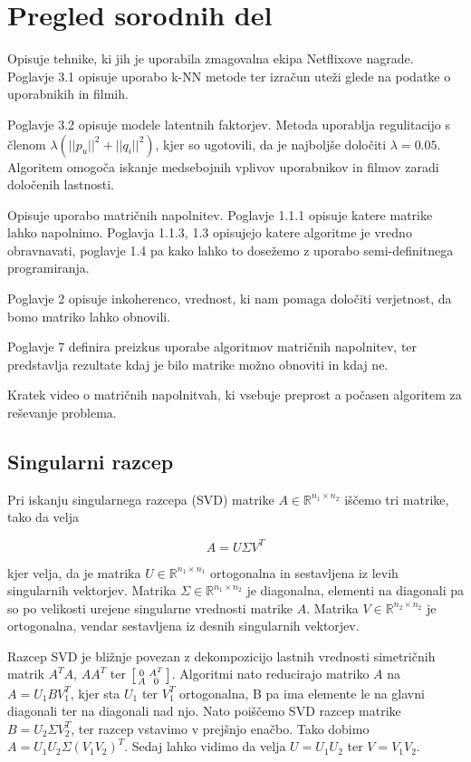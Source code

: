 \chapter{Pregled sorodnih del}


\cite{BK07} Opisuje tehnike, ki jih je uporabila zmagovalna ekipa Netflixove nagrade.
Poglavje 3.1 opisuje uporabo k-NN metode ter izračun uteži glede na podatke o uporabnikih in filmih.

Poglavje 3.2 opisuje modele latentnih faktorjev. Metoda uporablja regulitacijo 
s členom $\lambda (||p_u||^2 + ||q_i||^2)$, kjer so ugotovili,
da je najboljše določiti $\lambda=0.05$. Algoritem omogoča iskanje medsebojnih vplivov
uporabnikov in filmov zaradi določenih lastnosti.

\cite{CR08} Opisuje uporabo matričnih napolnitev.
Poglavje 1.1.1 opisuje katere matrike lahko napolnimo.
Poglavja 1.1.3, 1.3 opisujejo katere algoritme je vredno obravnavati, poglavje 1.4 pa kako lahko to dosežemo z uporabo semi-definitnega programiranja.

Poglavje 2 opisuje inkoherenco, vrednost, ki nam pomaga določiti verjetnost,
da bomo matriko lahko obnovili.

Poglavje 7 definira preizkus uporabe algoritmov matričnih napolnitev,
ter predstavlja rezultate kdaj je bilo matrike možno obnoviti in kdaj ne.

\cite{VV20} Kratek video o matričnih napolnitvah, ki vsebuje preprost a počasen algoritem 
za reševanje problema.

\section{Singularni razcep}

Pri iskanju singularnega razcepa (SVD) matrike $A \in \mathbb{R}^{n_1 \times n_2}$ iščemo tri matrike, tako da velja

\[
A = U \Sigma V^T
\]

kjer velja, da je matrika $U \in \mathbb{R}^{n_1 \times n_1}$ ortogonalna in sestavljena iz levih singularnih vektorjev. Matrika $\Sigma \in \mathbb{R}^{n_1 \times n_2}$ je diagonalna, elementi na diagonali pa so po velikosti urejene singularne vrednosti matrike $A$. Matrika $V \in \mathbb{R}^{n_2 \times n_2}$ je ortogonalna, vendar sestavljena iz desnih singularnih vektorjev. 

Razcep SVD je bližnje povezan z dekompozicijo lastnih vrednosti simetričnih matrik $A^T A$, $A A^T$ ter 
$\begin{bsmallmatrix}
  0 & A^T\\
  A & 0
\end{bsmallmatrix}$.
Algoritmi nato reducirajo matriko $A$  na $A = U_1BV_1^T$, kjer sta $U_1$ ter $V_1^T$ ortogonalna, B pa ima elemente le na glavni diagonali ter na diagonali nad njo. Nato poiščemo SVD razcep matrike $B = U_2 \Sigma V_2^T$, ter razcep vstavimo v prejšnjo enačbo. Tako dobimo $A = U_1U_2 \Sigma (V_1V_2)^T$. Sedaj lahko vidimo da velja $U = U_1U_2$ ter $V = V_1V_2$.\cite{D97}